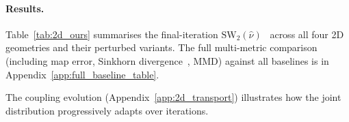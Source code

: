 \documentclass[11pt]{article}
\theoremstyle{definition}
\numberwithin{equation}{section}%
\begin{document}


\paragraph{Results.}
Table~\ref{tab:2d_ours} summarises the final-iteration $\mathrm{SW}_2(\hat\nu)$~\citep{bonneel2015sliced}
across all four 2D geometries and their perturbed variants.
The full multi-metric comparison (including map error, Sinkhorn divergence~\citep{feydy2019interpolating},
MMD) against all baselines is in Appendix~\ref{app:full_baseline_table}.



The coupling evolution (Appendix~\ref{app:2d_transport})
illustrates how the joint distribution progressively adapts over iterations.
\end{document}
